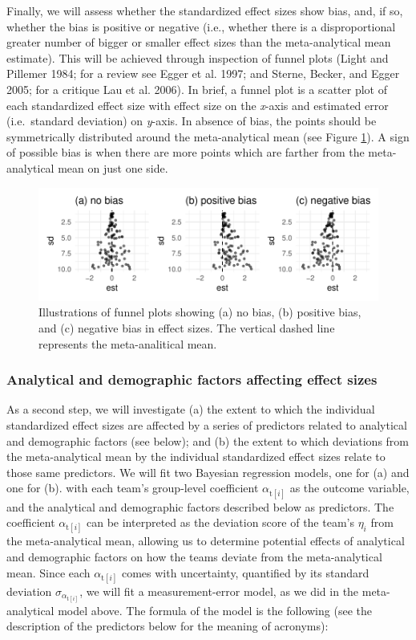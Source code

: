 \documentclass[
  12pt,
]{article}
\begin{document}
Finally, we will assess whether the standardized effect sizes show bias, and, if so, whether the bias is positive or negative (i.e., whether there is a disproportional greater number of bigger or smaller effect sizes than the meta-analytical mean estimate).
This will be achieved through inspection of funnel plots (Light and Pillemer 1984; for a review see Egger et al. 1997; and Sterne, Becker, and Egger 2005; for a critique Lau et al. 2006).
In brief, a funnel plot is a scatter plot of each standardized effect size with effect size on the \emph{x}-axis and estimated error (i.e.~standard deviation) on \emph{y}-axis.
In absence of bias, the points should be symmetrically distributed around the meta-analytical mean (see Figure \ref{fig:funnel-plot}).
A sign of possible bias is when there are more points which are farther from the meta-analytical mean on just one side.

\begin{figure}
\centering
\includegraphics{Draft_RR_files/figure-latex/funnel-plot-1.pdf}
\caption{\label{fig:funnel-plot}Illustrations of funnel plots showing (a) no bias, (b) positive bias, and (c) negative bias in effect sizes. The vertical dashed line represents the meta-analitical mean.}
\end{figure}

\hypertarget{ana-factors}{%
\subsubsection{Analytical and demographic factors affecting effect sizes}\label{ana-factors}}

As a second step, we will investigate (a) the extent to which the individual standardized effect sizes are affected by a series of predictors related to analytical and demographic factors (see below); and (b) the extent to which deviations from the meta-analytical mean by the individual standardized effect sizes relate to those same predictors.
We will fit two Bayesian regression models, one for (a) and one for (b).
with each team's group-level coefficient \(\alpha_{\text{t}[i]}\) as the outcome variable, and the analytical and demographic factors described below as predictors.
The coefficient \(\alpha_{\text{t}[i]}\) can be interpreted as the deviation score of the team's \(\eta_i\) from the meta-analytical mean, allowing us to determine potential effects of analytical and demographic factors on how the teams deviate from the meta-analytical mean.
Since each \(\alpha_{\text{t}[i]}\) comes with uncertainty, quantified by its standard deviation \(\sigma_{\alpha_{\text{t}[i]}}\), we will fit a measurement-error model, as we did in the meta-analytical model above.
The formula of the model is the following (see the description of the predictors below for the meaning of acronyms):
\end{document}
